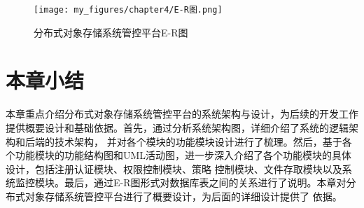 \begin{figure}[htb]
    \centering
    \texttt{[image: my\_figures/chapter4/E-R图.png]}
    \caption{分布式对象存储系统管控平台E-R图}
    \label{fig:E-R图}
\end{figure}

\section{本章小结}

本章重点介绍分布式对象存储系统管控平台的系统架构与设计，为后续的开发工作提供概要设计和基础依据。首先，通过分析系统架构图，详细介绍了系统的逻辑架构和后端的技术架构，
并对各个模块的功能模块设计进行了梳理。然后，基于各个功能模块的功能结构图和UML活动图，进一步深入介绍了各个功能模块的具体设计，包括注册认证模块、权限控制模块、策略
控制模块、文件存取模块以及系统监控模块。最后，通过E-R图形式对数据库表之间的关系进行了说明。本章对分布式对象存储系统管控平台进行了概要设计，为后面的详细设计提供了
依据。